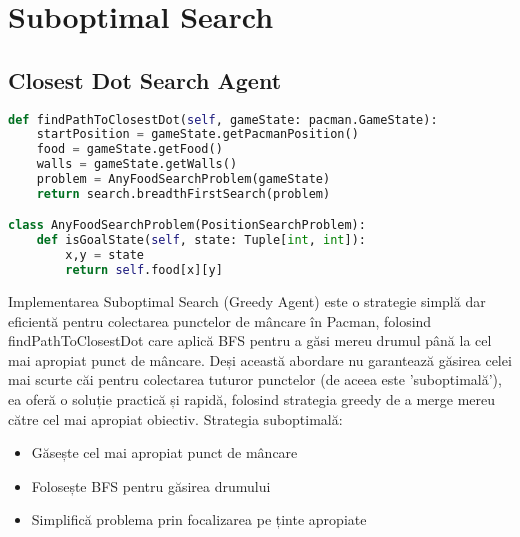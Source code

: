 \documentclass[12pt,a4paper]{article}
\begin{document}
\section{Suboptimal Search}

\subsection{Closest Dot Search Agent}
\begin{lstlisting}[language=Python]
def findPathToClosestDot(self, gameState: pacman.GameState):
    startPosition = gameState.getPacmanPosition()
    food = gameState.getFood()
    walls = gameState.getWalls()
    problem = AnyFoodSearchProblem(gameState)
    return search.breadthFirstSearch(problem)

class AnyFoodSearchProblem(PositionSearchProblem):
    def isGoalState(self, state: Tuple[int, int]):
        x,y = state
        return self.food[x][y]
\end{lstlisting}

Implementarea Suboptimal Search (Greedy Agent) este o strategie simplă dar eficientă pentru colectarea punctelor de mâncare în Pacman, folosind findPathToClosestDot care aplică BFS pentru a găsi mereu drumul până la cel mai apropiat punct de mâncare. Deși această abordare nu garantează găsirea celei mai scurte căi pentru colectarea tuturor punctelor (de aceea este 'suboptimală'), ea oferă o soluție practică și rapidă, folosind strategia greedy de a merge mereu către cel mai apropiat obiectiv.
Strategia suboptimală:
\begin{itemize}
    \item Găsește cel mai apropiat punct de mâncare
    \item Folosește BFS pentru găsirea drumului
    \item Simplifică problema prin focalizarea pe ținte apropiate
\end{itemize}
\end{document}
